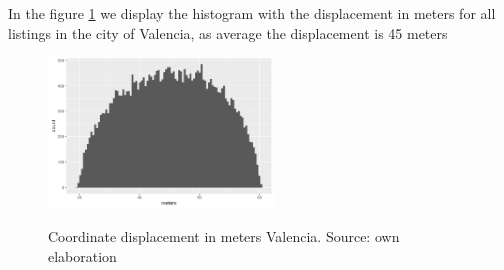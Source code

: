 \documentclass[times,final]{elsarticle}
\begin{document}
In the figure \ref{fig:coordinates-displacement} we display the histogram with the displacement in meters for all listings in the city of Valencia, as average the displacement is 45 meters

\begin{figure}
  \caption{Coordinate displacement in meters Valencia. Source: own elaboration}
  \centering
  \includegraphics[width=6cm, height=4cm]{figures/coordinates/coordinates-valencia}
  \label{fig:coordinates-displacement}
\end{figure}


\end{document}
